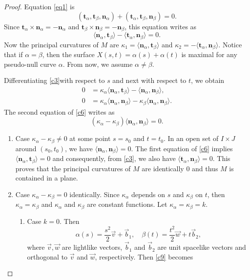 \documentclass[a4paper,12pt]{amsart}
\numberwithin{equation}{section}
\theoremstyle{definition}
\def\t{\mathbf t}
\def\n{\mathbf n}
\begin{document}
\begin{proof}
Equation \eqref{eq1} is 
$$(\t_\alpha,\t_\beta,\n_\alpha)+(\t_\alpha,\t_\beta,\n_\beta)=0.$$
Since $\t_\alpha\times\n_\alpha=-\n_\alpha$ and $\t_\beta\times\n_\beta=-\n_\beta$, this equation writes as
\begin{equation}\label{c3}
 \langle \n_\alpha,\t_\beta\rangle-\langle\t_\alpha,\n_\beta\rangle=0.
\end{equation}
Now the principal curvatures of $M$ are $\kappa_1=\langle \n_\alpha,\t_\beta\rangle$ and $\kappa_2=-\langle\t_\alpha,\n_\beta\rangle$. 
Notice that if $\alpha=\beta$, then the surface $X(s,t)=\alpha(s)+\alpha(t)$ is maximal for any pseudo-null curve $\alpha$.  From now, we assume $\alpha\not=\beta$.

Differentiating  \eqref{c3}with respect to $s$ and next with respect to $t$,  we obtain 
\begin{equation}\label{c6}
\begin{split}
0&=\kappa_\alpha\langle\n_\alpha,\t_\beta\rangle-\langle\n_\alpha,\n_\beta\rangle,\\
0&=\kappa_\alpha\langle\n_\alpha,\n_\beta\rangle-\kappa_\beta\langle\n_\alpha,\n_\beta\rangle.
\end{split}
\end{equation}
The second equation of \eqref{c6}  writes as
$$(\kappa_\alpha-\kappa_\beta)\langle\n_\alpha,\n_\beta\rangle=0.$$
\begin{enumerate}
\item Case $\kappa_\alpha-\kappa_\beta\not=0$ at some point $s=s_0$ and $t=t_0$. In an open set of $I\times J$ around $(s_0,t_0)$,  we have   $\langle\n_\alpha,\n_\beta\rangle=0$. The first equation of \eqref{c6} implies $\langle\n_\alpha,\t_\beta\rangle=0$ and consequently, from \eqref{c3}, we also have $\langle \t_\alpha,\n_\beta\rangle=0$. This proves that the principal curvatures of $M$ are identically $0$ and thus $M$ is contained in a plane. 
\item Case $\kappa_\alpha-\kappa_\beta=0$ identically. Since $\kappa_\alpha$ depends on $s$ and $\kappa_\beta$ on $t$, then $\kappa_\alpha=\kappa_\beta$ and $\kappa_\alpha$ and $\kappa_\beta$ are constant functions. Let   $\kappa_\alpha=\kappa_\beta=k$.
\begin{enumerate}
\item Case $k=0$. Then 
$$\alpha(s)=\frac{s^2}{2}\vec{v}+\vec{b}_1,\quad \beta(t)=\frac{t^2}{2}\vec{w}+t\vec{b}_2,$$
where $\vec{v},\vec{w}$ are lightlike vectors, $\vec{b}_1$ and $\vec{b}_2$ are unit spacelike vectors and orthogonal to $\vec{v}$ and $\vec{w}$, respectively. Then \eqref{c9} becomes

\end{enumerate}
\end{enumerate}
\end{proof}
\end{document}
